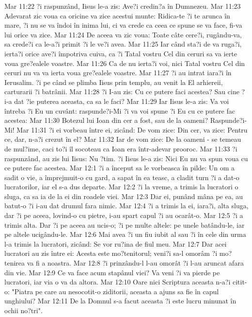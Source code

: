 Mar 11:22  ?i raspunzând, Iisus le-a zis: Ave?i credin?a în Dumnezeu.
Mar 11:23  Adevarat zic voua ca oricine va zice acestui munte: Ridica-te ?i te arunca în mare, ?i nu se va îndoi în inima lui, ci va crede ca ceea ce spune se va face, fi-va lui orice va zice.
Mar 11:24  De aceea va zic voua: Toate câte cere?i, rugându-va, sa crede?i ca le-a?i primit ?i le ve?i avea.
Mar 11:25  Iar când sta?i de va ruga?i, ierta?i orice ave?i împotriva cuiva, ca ?i Tatal vostru Cel din ceruri sa va ierte voua gre?ealele voastre.
Mar 11:26  Ca de nu ierta?i voi, nici Tatal vostru Cel din ceruri nu va va ierta voua gre?ealele voastre.
Mar 11:27  ?i au intrat iara?i în Ierusalim. ?i pe când se plimba Iisus prin templu, au venit la El arhiereii, carturarii ?i batrânii.
Mar 11:28  ?i I-au zis: Cu ce putere faci acestea? Sau cine ?i-a dat ?ie puterea aceasta, ca sa le faci?
Mar 11:29  Iar Iisus le-a zis: Va voi întreba ?i Eu un cuvânt: raspunde?i-Mi ?i va voi spune ?i Eu cu ce putere fac acestea:
Mar 11:30  Botezul lui Ioan din cer a fost, sau de la oameni? Raspunde?i-Mi!
Mar 11:31  ?i ei vorbeau între ei, zicând: De vom zice: Din cer, va zice: Pentru ce, dar, n-a?i crezut în el?
Mar 11:32  Iar de vom zice: De la oameni - se temeau de mul?ime, caci to?i îl socoteau ca Ioan era într-adevar prooroc.
Mar 11:33  ?i raspunzând, au zis lui Iisus: Nu ?tim. ?i Iisus le-a zis: Nici Eu nu va spun voua cu ce putere fac acestea.
Mar 12:1  ?i a început sa le vorbeasca în pilde: Un om a sadit o vie, a împrejmuit-o cu gard, a sapat în ea teasc, a cladit turn ?i a dat-o lucratorilor, iar el s-a dus departe.
Mar 12:2  ?i la vreme, a trimis la lucratori o sluga, ca sa ia de la ei din roadele viei.
Mar 12:3  Dar ei, punând mâna pe ea, au batut-o ?i i-au dat drumul fara nimic.
Mar 12:4  ?i a trimis la ei, iara?i, alta sluga, dar ?i pe aceea, lovind-o cu pietre, i-au spart capul ?i au ocarât-o.
Mar 12:5  ?i a trimis alta. Dar ?i pe aceea au ucis-o; ?i pe multe altele: pe unele batându-le, iar pe altele ucigându-le.
Mar 12:6  Mai avea ?i un fiu iubit al sau ?i în cele din urma l-a trimis la lucratori, zicând: Se vor ru?ina de fiul meu.
Mar 12:7  Dar acei lucratori au zis între ei: Acesta este mo?tenitorul; veni?i sa-l omorâm ?i mo?tenirea va fi a noastra.
Mar 12:8  ?i prinzându-l l-au omorât ?i l-au aruncat afara din vie.
Mar 12:9  Ce va face acum stapânul viei? Va veni ?i va pierde pe lucratori, iar via o va da altora.
Mar 12:10  Oare nici Scriptura aceasta n-a?i citit-o: "Piatra pe care au nesocotit-o ziditorii, aceasta a ajuns sa fie în capul unghiului?
Mar 12:11  De la Domnul s-a facut aceasta ?i este lucru minunat în ochii no?tri".
